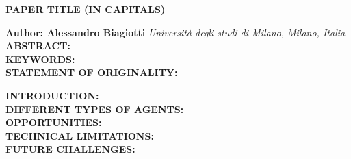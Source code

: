 \documentclass[a4paper,10pt]{article}
\begin{document}
\noindent 
\begin{center}
\textbf{{\Large PAPER TITLE (IN CAPITALS)}} \\
\end{center}

\noindent 
\textbf{Author: Alessandro Biagiotti} \textit{Università degli studi di Milano, Milano, Italia}
\\


\noindent 
\textbf{ABSTRACT:}
\\

\noindent 
\textbf{KEYWORDS:} 
\\

\noindent 
\textbf{STATEMENT OF ORIGINALITY:} 

\clearpage

\noindent
\textbf{INTRODUCTION:}
\label{sec:introduction}
\\



\noindent
\textbf{DIFFERENT TYPES OF AGENTS:}
\makeatletter\def\@currentlabel{(I)}\makeatother
\label{sec:ai-agents}
\\


\noindent
\textbf{OPPORTUNITIES:}
\label{sec:opportunities}
\\


\noindent
\textbf{TECHNICAL LIMITATIONS:}
\label{sec:technical-limitations}
\\


\noindent
\textbf{FUTURE CHALLENGES:}
\label{sec:future-challenges}
\\

\clearpage
\printbibliography
\end{document}
